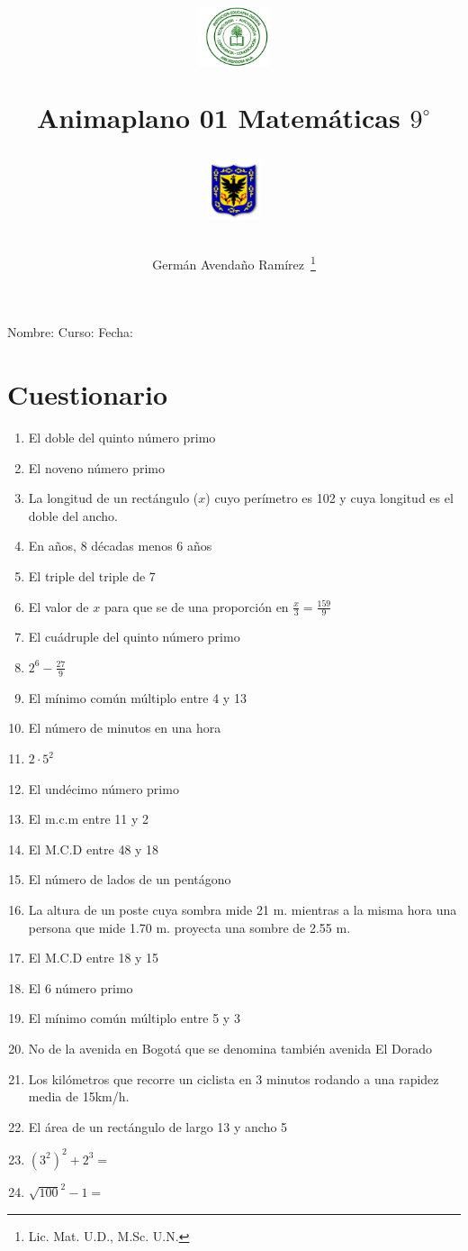 \documentclass[letterpaper,11pt,twoside]{article}
\author{Germ\'an Avenda\~no Ram\'irez~\thanks{Lic. Mat. U.D., M.Sc. U.N.}}
\title{\begin{minipage}{.2\textwidth}
\includegraphics[height=1.75cm]{Images/logo-colegio.png}\end{minipage}
\begin{minipage}{.55\textwidth}
\begin{center}
Animaplano 01
Matemáticas $9^{\circ}$
\end{center}
\end{minipage}\hfill
\begin{minipage}{.2\textwidth}
\includegraphics[height=1.75cm]{Images/logo-sed.png} 
\end{minipage}}
\date{}
\begin{document}
\maketitle
Nombre: \hrulefill Curso: \underline{\hspace*{44pt}} Fecha: \underline{\hspace*{2.5cm}}
\section*{Cuestionario}
\begin{enumerate}
\item El doble del quinto n\'{u}mero primo
\item El noveno n\'{u}mero primo
\item La longitud de un rect\'{a}ngulo ($x$) cuyo per\'{i}metro es 102 y cuya longitud es el doble del ancho.
\item En años, 8 décadas menos 6 años
\item El triple del triple de 7
\item El valor de $x$ para que se de una proporci\'{o}n en $\frac{x}{3}=\frac{159}{9}$
\item El cuádruple del quinto número primo
\item $2^{6}-\frac{27}{9}$
\item El mínimo común múltiplo entre 4 y 13
\item El número de minutos en una hora
\item $2\cdot 5^{2}$
\item El undécimo número primo
\item El m.c.m entre 11 y 2
\item El M.C.D entre 48 y 18
\item El número de lados de un pentágono
\item La altura de un poste cuya sombra mide 21 m. mientras a la misma hora una persona que mide 1.70 m. proyecta una sombre de 2.55 m.
\item El M.C.D entre 18 y 15
\item El 6 número primo
\item El mínimo común múltiplo entre 5 y 3
\item No de la avenida en Bogotá que se denomina también avenida El Dorado
\item Los kilómetros que recorre un ciclista en 3 minutos rodando a una rapidez media de 15km/h.
\item El área de un rectángulo de largo 13 y ancho 5
\item $(3^{2})^{2}+2^{3}=$
\item $\sqrt{100}^{2}-1=$
\end{enumerate}
\end{document}
